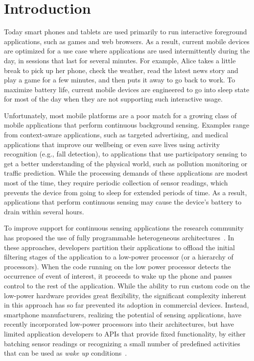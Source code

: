 
\section{\label{sec:Introduction}Introduction}

Today smart phones and tablets are used primarily to run interactive
foreground applications, such as games and web browsers.  As a result,
current mobile devices are optimized for a use case where applications
are used intermittently during the day, in sessions that last for
several minutes.  For example, Alice takes a little break to pick up
her phone, check the weather, read the latest news story and play a
game for a few minutes, and then puts it away to go back to work.  To
maximize battery life, current mobile devices are engineered to go
into sleep state for most of the day when they are not supporting
such interactive usage.

Unfortunately, most mobile platforms are a poor match for a growing
class of mobile applications that perform continuous background
sensing.  Examples range from context-aware applications, such as
targeted advertising, and medical applications that improve our
wellbeing or even save lives using activity recognition (e.g., fall
detection), to applications that use participatory sensing to get a
better understanding of the physical world, such as pollution
monitoring or traffic prediction.  While the processing demands of
these applications are modest most of the time, they require periodic
collection of sensor readings, which prevents the device from going to
sleep for extended periods of time.  As a result, applications that
perform continuous sensing may cause the device's battery to drain
within several hours.

To improve support for continuous sensing applications the research
community has proposed the use of fully programmable heterogeneous
architectures~\cite{reflex,turducken}.  In these approaches, developers
partition their applications to offload the initial filtering stages
of the application to a low-power processor (or a hierarchy of
processors).  When the code running on the low power processor detects
the occurrence of event of interest, it proceeds to wake up the phone
and passes control to the rest of the application.  While the ability
to run custom code on the low-power hardware provides great
flexibility, the significant complexity inherent in this approach has
so far prevented its adoption in commercial devices.  Instead,
smartphone manufacturers, realizing the potential of sensing
applications, have recently incorporated low-power processors into
their architectures, but have limited application developers to APIs
that provide fixed functionality, by either batching sensor readings
or recognizing a small number of predefined activities that can be
used as {\em wake up} conditions~\cite{android4.4,motox,nexus5}.

